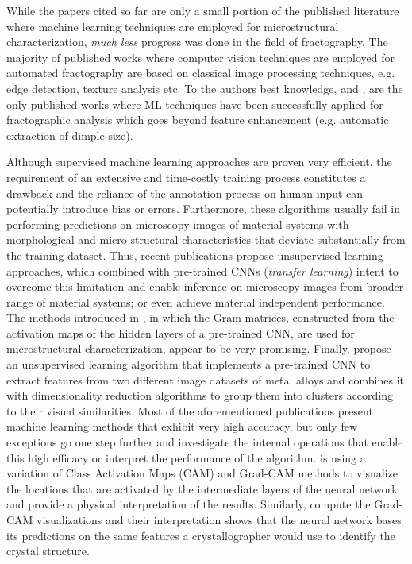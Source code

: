 \documentclass[authoryear,preprint,review,12pt, singleside]{elsarticle}
\begin{document}
While the papers cited so far are only a small portion of the published literature where machine learning techniques are employed for microstructural characterization,  \textit{much less} progress was done in the field of fractography.  The majority of published works where computer vision techniques are employed for automated fractography  are based on classical image processing techniques, e.g. edge detection, texture analysis etc.  To the authors best knowledge, \citet{ bastidas2020deep, Konovalenko2018, holm1} and \citet{qf1} , are the only published works where ML techniques have been successfully applied for fractographic analysis which goes beyond feature enhancement (e.g. automatic extraction of dimple size).


Although supervised machine learning approaches are proven very efficient, the requirement of an extensive and time-costly training process constitutes a drawback and the reliance of the annotation process on human input can potentially introduce bias or errors. Furthermore, these algorithms usually fail in performing predictions on microscopy images of material systems with morphological and micro-structural characteristics that deviate substantially from the training dataset.  Thus, recent publications propose unsupervised learning approaches, which combined with pre-trained CNNs (\textit{transfer learning}) intent to overcome this limitation and enable inference on microscopy images from broader range of material systems; or even achieve material independent performance. The methods introduced in \citet{unsuper1}, in which the Gram matrices, constructed from the activation maps of the hidden layers of a pre-trained CNN, are used for microstructural characterization, appear to be very promising. Finally, \citet{holm1} propose an unsupervised learning algorithm that implements a pre-trained CNN to extract features from two different image datasets of metal alloys and combines it with dimensionality reduction algorithms to group them into clusters according to their visual similarities.  
Most of the aforementioned publications present machine learning methods that exhibit very high accuracy, but only few exceptions \citep{micro1, crystal1} go one step further and investigate the internal operations that enable this high efficacy or interpret the performance of the algorithm. \cite{micro1} is using a variation of Class Activation Maps (CAM) \citep{cam} and Grad-CAM \citep{grad_cam} methods to visualize the locations that are activated by the intermediate layers of the neural network and provide a physical interpretation of the results. Similarly, \citet{crystal1} compute the Grad-CAM visualizations and their interpretation shows that the neural network bases its predictions on the same features a crystallographer would use to identify the crystal structure.  
\end{document}
